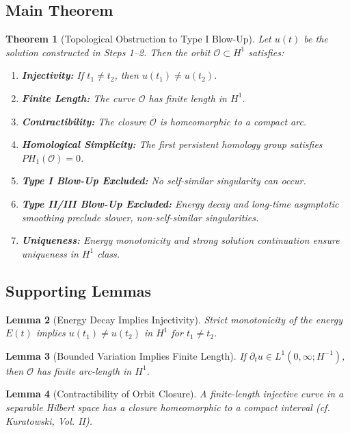 \documentclass[11pt]{article}
\newtheorem{theorem}{Theorem}[section]
\newtheorem{lemma}[theorem]{Lemma}
\theoremstyle{definition}
\begin{document}
\subsection*{Main Theorem}
\begin{theorem}[Topological Obstruction to Type I Blow-Up]
Let \( u(t) \) be the solution constructed in Steps 1–2. Then the orbit \( \mathcal{O} \subset H^1 \) satisfies:
\begin{enumerate}
  \item \textbf{Injectivity:} If \( t_1 \ne t_2 \), then \( u(t_1) \ne u(t_2) \).
  \item \textbf{Finite Length:} The curve \( \mathcal{O} \) has finite length in \( H^1 \).
  \item \textbf{Contractibility:} The closure \( \overline{\mathcal{O}} \) is homeomorphic to a compact arc.
  \item \textbf{Homological Simplicity:} The first persistent homology group satisfies \( PH_1(\mathcal{O}) = 0 \).
  \item \textbf{Type I Blow-Up Excluded:} No self-similar singularity can occur.
  \item \textbf{Type II/III Blow-Up Excluded:} Energy decay and long-time asymptotic smoothing preclude slower, non-self-similar singularities.
  \item \textbf{Uniqueness:} Energy monotonicity and strong solution continuation ensure uniqueness in \( H^1 \) class.
\end{enumerate}
\end{theorem}

\subsection*{Supporting Lemmas}
\begin{lemma}[Energy Decay Implies Injectivity]
Strict monotonicity of the energy \( E(t) \) implies \( u(t_1) \ne u(t_2) \) in \( H^1 \) for \( t_1 \ne t_2 \).
\end{lemma}

\begin{lemma}[Bounded Variation Implies Finite Length]
If \( \partial_t u \in L^1(0,\infty; H^{-1}) \), then \( \mathcal{O} \) has finite arc-length in \( H^1 \).
\end{lemma}

\begin{lemma}[Contractibility of Orbit Closure]
A finite-length injective curve in a separable Hilbert space has a closure homeomorphic to a compact interval (cf. Kuratowski, Vol. II).
\end{lemma}
\end{document}
